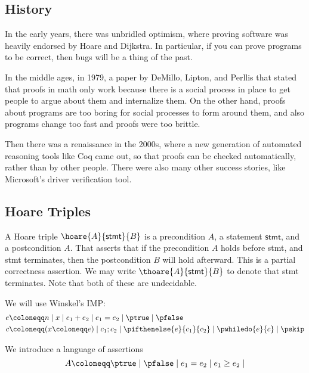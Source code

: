 \documentclass[class=scrartcl]{standalone}
\begin{document}
\subsection{History}
In the early years, there was unbridled optimism,
where proving software was heavily endorsed by Hoare and Dijkstra.
In particular, if you can prove programs to be correct,
then bugs will be a thing of the past.

In the middle ages, in 1979, a paper by DeMillo, Lipton, and Perllis
that stated that proofs in math only work because
there is a social process in place to get people to argue about them
and internalize them.
On the other hand, proofs about programs are too boring
for social processes to form around them,
and also programs change too fast and proofs were too brittle.

Then there was a renaissance in the 2000s,
where a new generation of automated reasoning tools like Coq came out,
so that proofs can be checked automatically,
rather than by other people.
There were also many other success stories,
like Microsoft's driver verification tool.

\subsection{Hoare Triples}
A Hoare triple \(\hoare{A}{\textsf{stmt}}{B}\) is
a precondition \(A\),
a statement \(\textsf{stmt}\), and
a postcondition \(A\).
That asserts that if the precondition \(A\) holds before \textsf{stmt},
and \textsf{stmt} terminates, then the postcondition \(B\) will hold afterward.
This is a partial correctness assertion.
We may write \(\thoare{A}{\textsf{stmt}}{B}\)
to denote that \textsf{stmt} terminates.
Note that both of these are undecidable.

We will use Winskel's IMP:
\begin{align*}
  e &\coloneqq n
          \mid x
          \mid e_1 + e_2
          \mid e_1 = e_2
          \mid \ptrue
          \mid \pfalse \\
  c &\coloneqq (x \coloneqq e)
          \mid c_1; c_2
          \mid \pifthenelse{e}{c_1}{c_2}
          \mid \pwhiledo{e}{c}
          \mid \pskip
\end{align*}

We introduce a language of assertions
\[
  A \coloneqq \ptrue
         \mid \pfalse
         \mid e_1 = e_2
         \mid e_1 \geq e_2
         \mid 
\]

\end{document}
